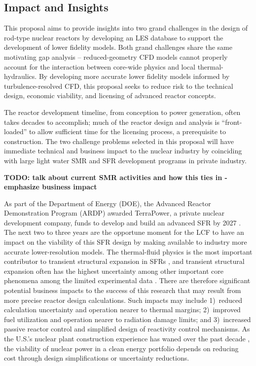\vspace{-.25in}
\subsection{Impact and Insights}
\vspace{-.2in}

This proposal aims to provide insights into two grand challenges in the design of rod-type nuclear reactors by developing an LES database to support the development of lower fidelity models. Both grand challenges share the same motivating gap analysis -- reduced-geometry CFD models cannot properly account for the interaction between core-wide physics and local thermal-hydraulics. By developing more accurate lower fidelity models informed by turbulence-resolved CFD, this proposal seeks to reduce risk to the technical design, economic viability, and licensing of advanced reactor concepts. 

The reactor development timeline, from conception to power generation, often takes decades to accomplish; much of the reactor design and analysis is ``front-loaded'' to allow sufficient time for the licensing process, a prerequisite to construction. The two challenge problems selected in this proposal will have immediate technical and business impact to the nuclear industry by coinciding with large light water SMR and SFR development programs in private industry.

{\bf TODO: talk about current SMR activities and how this ties in - emphasize business impact}

As part of the Department of Energy (DOE), the Advanced Reactor Demonstration Program (ARDP) awarded TerraPower, a private nuclear development company, funds to develop and build an advanced SFR by 2027 \cite{ardp_tp}. The next two to three years are the opportune moment for the LCF to have an impact on the viability of this SFR design by making available to industry more accurate lower-resolution models. The thermal-fluid physics is the most important contributor to transient structural expansion in SFRs \cite{wozniak}, and transient structural expansion often has the highest uncertainty among other important core phenomena among the limited experimental data \cite{lum}. There are therefore significant potential business impacts to the success of this research that may result from more precise reactor design calculations. Such impacts may include 1)~reduced calculation uncertainty and operation nearer to thermal margins; 2)~improved fuel utilization and operation nearer to radiation damage limits; and 3)~increased passive reactor control and simplified design of reactivity control mechanisms. As the U.S.'s nuclear plant construction experience has waned over the past decade \cite{schlissel}, the viability of nuclear power in a clean energy portfolio depends on reducing cost through design simplifications or uncertainty reductions. 


